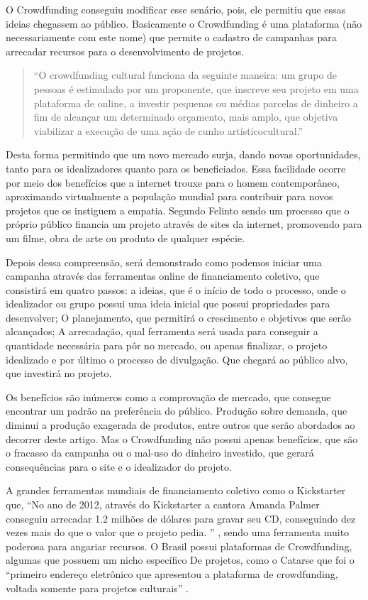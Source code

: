 \documentclass{classe_cn}                 %
\begin{document}
O Crowdfunding conseguiu modificar esse senário, pois, ele permitiu que essas ideias chegassem ao público. Basicamente o Crowdfunding é uma plataforma (não necessariamente com este nome) que permite o cadastro de campanhas para arrecadar recursos para o desenvolvimento de projetos.

\begin{quote}
“O crowdfunding cultural funciona da seguinte maneira: um grupo de pessoas é estimulado por um proponente, que inscreve seu projeto em uma plataforma de online, a investir pequenas ou médias parcelas de dinheiro a fim de alcançar um determinado orçamento, mais amplo, que objetiva viabilizar a execução de uma ação de cunho artísticocultural.”\cite[p. 3]{SEQUEIRA:sd}
 \end{quote}

Desta forma permitindo que um novo mercado surja, dando novas oportunidades, tanto para os idealizadores quanto para os beneficiados. Essa facilidade ocorre por meio dos benefícios que a internet trouxe para o homem contemporâneo, aproximando virtualmente a população mundial para contribuir para novos projetos que os instiguem a empatia. Segundo Felinto \cite{FELINTO:2012} sendo um processo que o próprio público financia um projeto através de sites da internet, promovendo para um filme, obra de arte ou produto de qualquer espécie.

Depois dessa compreensão, será demonstrado como podemos iniciar uma campanha através das ferramentas online de financiamento coletivo, que consistirá em quatro passos: a ideias, que é o início de todo o processo, onde o idealizador ou grupo possui uma ideia inicial que possui propriedades para desenvolver; O planejamento, que permitirá o crescimento e objetivos que serão alcançados; A arrecadação, qual ferramenta será usada para conseguir a quantidade necessária para pôr no mercado, ou apenas finalizar, o projeto idealizado e por último o processo de divulgação. Que chegará ao público alvo, que investirá no projeto.

Os benefícios são inúmeros como a comprovação de mercado, que consegue encontrar um padrão na preferência do público. Produção sobre demanda, que diminui a produção exagerada de produtos, entre outros que serão abordados ao decorrer deste artigo. Mas o Crowdfunding não possui apenas benefícios, que são o fracasso da campanha ou o mal-uso do dinheiro investido, que gerará consequências para o site e o idealizador do projeto.

A grandes ferramentas mundiais de financiamento coletivo como o Kickstarter que, “No ano de 2012, através do Kickstarter a cantora Amanda Palmer conseguiu arrecadar 1.2 milhões de dólares para gravar seu CD, conseguindo dez vezes mais do que o valor que o projeto pedia. ” \cite[p. 9]{CAVALCANTI:2013}, sendo uma ferramenta muito poderosa para angariar recursos. O Brasil possui plataformas de Crowdfunding, algumas que possuem um nicho específico De projetos, como o Catarse que foi o “primeiro endereço eletrônico que apresentou a plataforma de crowdfunding, voltada somente para projetos culturais” \cite{COCATE:2012}.
\end{document}
